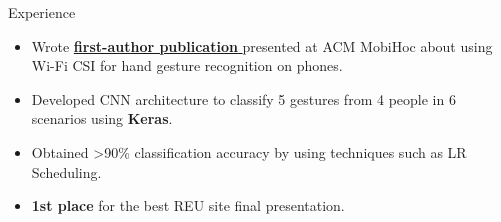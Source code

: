 \documentclass{resume} %
\begin{document}
\begin{workSection}{Experience}
    \experienceItem[
    company=Temple University,
    location=Philadelphia{,} PA,
    position=Undergraduate Research Intern,
    duration=June {-} July 2023
    ]
    \begin{itemize}
        \vspace{-0.5em}
        \itemsep -6pt {}
        \item Wrote
        \href{https://dl.acm.org/doi/10.1145/3565287.3617613}{\textbf{first-author publication} \faExternalLink} 
        presented at ACM MobiHoc about using Wi-Fi CSI for hand gesture recognition on phones.
        \item Developed CNN architecture to classify 5 gestures from 4 people in 6 scenarios using \textbf{Keras}. %
        \item Obtained >90\% classification accuracy by using techniques such as LR Scheduling.
        \item \textbf{1st place} for the best REU site final presentation. %
    \end{itemize}

\end{workSection}
\end{document}
